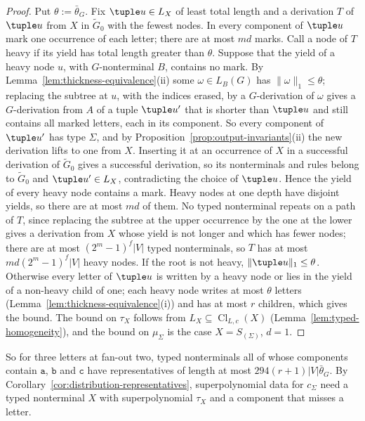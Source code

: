 \begin{proof}
Put $\theta:=\bar\theta_G$.  Fix $\tuple u\in L_X$ of least total length and a
derivation $T$ of $\tuple u$ from $X$ in $\widetilde G_0$ with the fewest nodes.
In every component of $\tuple u$ mark one occurrence of each letter; there are at
most $md$ marks.  Call a node of $T$ heavy if its yield has total length greater
than $\theta$.  Suppose that the yield of a heavy node $u$, with $G$-nonterminal
$B$, contains no mark.  By Lemma~\ref{lem:thickness-equivalence}(ii) some
$\omega\in L_B(G)$ has $\|\omega\|_1\le\theta$; replacing the subtree at $u$, with
the indices erased, by a $G$-derivation of $\omega$ gives a $G$-derivation from
$A$ of a tuple $\tuple u'$ that is shorter than $\tuple u$ and still contains all
marked letters, each in its component.  So every component of $\tuple u'$ has
type $\Sigma$, and by Proposition~\ref{prop:output-invariants}(ii) the new
derivation lifts to one from $X$.  Inserting it at an occurrence of $X$ in a
successful derivation of $\widetilde G_0$ gives a successful derivation, so its
nonterminals and rules belong to $\widetilde G_0$ and $\tuple u'\in L_X$,
contradicting the choice of $\tuple u$.  Hence the yield of every heavy node
contains a mark.  Heavy nodes at one depth have disjoint yields, so there are at
most $md$ of them.  No typed nonterminal repeats on a path of $T$, since
replacing the subtree at the upper occurrence by the one at the lower gives a
derivation from $X$ whose yield is not longer and which has fewer nodes; there
are at most $(2^m-1)^f|V|$ typed nonterminals, so $T$ has at most
$md(2^m-1)^f|V|$ heavy nodes.  If the root is not heavy,
$\|\tuple u\|_1\le\theta$.  Otherwise every letter of $\tuple u$ is written by a
heavy node or lies in the yield of a non-heavy child of one; each heavy node
writes at most $\theta$ letters (Lemma~\ref{lem:thickness-equivalence}(i)) and has
at most $r$ children, which gives the bound.  The bound on $\tau_X$ follows from
$L_X\subseteq\operatorname{Cl}_{L,c}(X)$ (Lemma~\ref{lem:typed-homogeneity}), and
the bound on $\mu_\Sigma$ is the case $X=S_{(\Sigma)}$, $d=1$.
\end{proof}

So for three letters at fan-out two, typed nonterminals all of whose components
contain $\mathtt a$, $\mathtt b$ and $\mathtt c$ have representatives of length at
most $294(r+1)|V|\bar\theta_G$.  By
Corollary~\ref{cor:distribution-representatives}, superpolynomial data for
$c_\Sigma$ need a typed nonterminal $X$ with superpolynomial $\tau_X$ and a
component that misses a letter.


